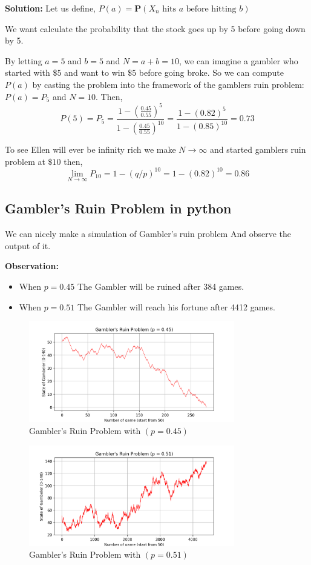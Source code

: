 \textbf{Solution: } Let us define,
$ P(a) = \mathbf{P}\left(X_{n} \text{ hits }a \text{ before hitting } b\right)$ 

We want calculate the probability that the stock goes up by 5 before going down by 5.

By letting $ a=5 $ and $ b=5 $ and $ N=a+b=10 $, we can imagine a gambler who started with $ \$5 $ and want to win $ \$5 $
before going broke. So we can compute $P(a)$ by casting the problem into the framework of the gamblers ruin problem: 
$ P(a) = P_{5} $ and $ N=10 $. Then,
\[
    P(5) = P_{5} = \frac{1-\left(\frac{0.45}{0.55}\right)^{5}}{1-\left(\frac{0.45}{0.55}\right)^{10}} = \frac{1-(0.82)^{5}}{1-(0.85)^{10}} = 0.73
\]

To see Ellen will ever be infinity rich we make  $ N\to\infty $ and started gamblers ruin problem at $ \$10 $ then,
\[
    \lim_{N\to\infty}P_{10} = 1 - (q/p)^{10} = 1 - (0.82)^{10} = 0.86
\]


\subsection{Gambler's Ruin Problem in python}
We can nicely make a simulation of Gambler's ruin problem And observe the output of it.

\textbf{Observation: }
\begin{itemize}
    \item When $ p=0.45 $ The Gambler will be ruined after 384 games.
    \item When $ p=0.51 $ The Gambler will reach his fortune after 4412 games.
\end{itemize}


\begin{figure}[H]
    \centering
    \includegraphics[width=0.8\textwidth]{pic/GR0.45.png}
    \caption{Gambler's Ruin Problem with $( p=0.45 )$}
\end{figure}

\makeatletter
\setlength{\@fptop}{0pt}
\makeatother

\begin{figure}[H]
    \centering
    \includegraphics[width=0.8\textwidth]{pic/GR0.51.png}
    \caption{Gambler's Ruin Problem with $( p=0.51 )$}
\end{figure}

